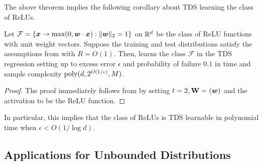 The above theorem implies the following corollary about TDS learning the class of ReLUs. 

\begin{corollary}
\label{clry:polytime_tds_relu_appendix}
    Let $\mathcal{F}=\{{\bm{x}}\rightarrow \max(0,{\bm{w}}\cdot {\bm{x}}):\|{\bm{w}}\|_{2}=1\}$ on $\mathbb{R}^{d}$ be the class of ReLU functions with unit weight vectors. Suppose the training and test distributions satisfy the assumptions from  with $R=O(1)$. Then,  learns the class $\mathcal{F}$ in the TDS regression setting up to excess error $\epsilon$ and probability of failure $0.1$ in time and sample complexity $\mathrm{poly}(d,2^{O(1/\epsilon)},M)$.
\end{corollary}
\begin{proof}
    The proof immediately follows from  by setting $t=2,\mathbf{W}=({\bm{w}})$ and the activation to be the ReLU function. 
\end{proof}

In particular, this implies that the class of ReLUs is TDS learnable in polynomial time when $\epsilon<O(1/\log d)$.




\subsection{Applications for Unbounded Distributions}\label{sec:tds_uniform_appendix}

